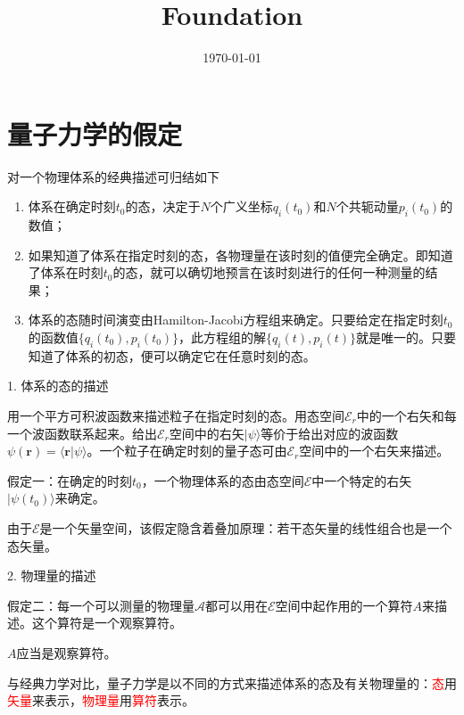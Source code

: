 \documentclass[11pt,a4paper]{article}
\title{Foundation}
\author{}
\date{\today}
\renewcommand{\vec}[1]{\boldsymbol{#1}}
\begin{document}
\maketitle

\section{量子力学的假定}
\cite{1986qmv1.book.....C} 对一个物理体系的经典描述可归结如下
\begin{enumerate}[label=(\roman*)]
\item 体系在确定时刻$t_0$的态，决定于$N$个广义坐标$q_i(t_0)$和$N$个共轭动量$p_i(t_0)$的数值；
\item 如果知道了体系在指定时刻的态，各物理量在该时刻的值便完全确定。即知道了体系在时刻$t_0$的态，就可以确切地预言在该时刻进行的任何一种测量的结果；
\item 体系的态随时间演变由Hamilton-Jacobi方程组来确定。只要给定在指定时刻$t_0$的函数值$\{q_i(t_0), p_i(t_0)\}$，此方程组的解$\{q_i(t), p_i(t)\}$就是唯一的。只要知道了体系的初态，便可以确定它在任意时刻的态。
\end{enumerate}

1. 体系的态的描述

用一个平方可积波函数来描述粒子在指定时刻的态。用态空间$\mathscr{E}_r$中的一个右矢和每一个波函数联系起来。给出$\mathscr{E}_r$空间中的右矢$|\psi \rangle$等价于给出对应的波函数$\psi(\vec{r}) = \langle \vec{r}|\psi\rangle$。一个粒子在确定时刻的量子态可由$\mathscr{E}_r$空间中的一个右矢来描述。
\begin{tcolorbox}[colback=green!15,colframe=green!40!black,title= ]
假定一：在确定的时刻$t_0$，一个物理体系的态由态空间$\mathscr{E}$中一个特定的右矢$|\psi(t_0) \rangle$来确定。
\end{tcolorbox}

由于$\mathscr{E}$是一个矢量空间，该假定隐含着叠加原理：若干态矢量的线性组合也是一个态矢量。

2. 物理量的描述
\begin{tcolorbox}[colback=green!15,colframe=green!40!black,title= ]
假定二：每一个可以测量的物理量$\mathscr{A}$都可以用在$\mathscr{E}$空间中起作用的一个算符$A$来描述。这个算符是一个观察算符。
\end{tcolorbox}

$A$应当是观察算符。

与经典力学对比，量子力学是以不同的方式来描述体系的态及有关物理量的：\textcolor{red}{态}用\textcolor{red}{矢量}来表示，\textcolor{red}{物理量}用\textcolor{red}{算符}表示。
\end{document}
